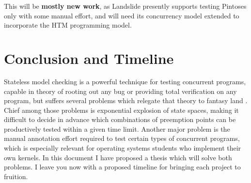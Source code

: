 \documentclass[12pt]{cmuthesis}
\begin{document}
\begin{itemize}
		This will be {\bf mostly new work}, as Landslide presently supports testing Pintoses only with some manual effort,
		and will need its concurrency model extended to incorporate the HTM programming model.
\end{itemize}














\chapter{Conclusion and Timeline}

Stateless model checking is a powerful technique for testing concurrent programs,
capable in theory of rooting out any bug or providing total verification on any program,
but suffers several problems which relegate that theory to fantasy land \cite{vargomax}.
Chief among those problems is exponential explosion of state spaces,
making it difficult to decide in advance which combinations of preemption points can be productively tested within a given time limit.
Another major problem is the manual annotation effort required to test certain types of concurrent programs,
which is especially relevant for operating systems students who implement their own kernels.
In this document I have proposed a thesis which will solve both problems.
I leave you now with a proposed timeline for bringing each project to fruition.
\end{document}

